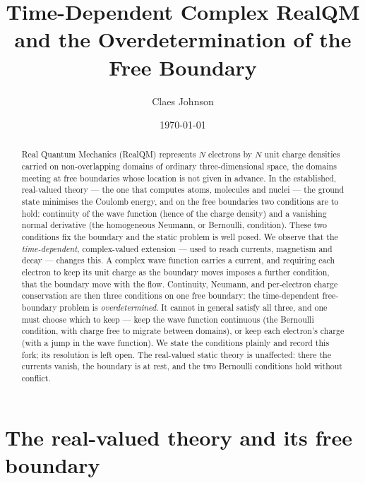 \documentclass[11pt]{article}
\title{Time-Dependent Complex RealQM\\
and the Overdetermination of the Free Boundary}
\author[1]{Claes Johnson}
\affil[1]{KTH Royal Institute of Technology, SE-100 44 Stockholm, Sweden \\
\texttt{claesjohnson@gmail.com}}
\date{\today}
\begin{document}
\maketitle

\begin{abstract}
Real Quantum Mechanics (RealQM) represents $N$ electrons by $N$ unit charge densities carried on
non-overlapping domains of ordinary three-dimensional space, the domains meeting at free boundaries whose
location is not given in advance. In the established, real-valued theory --- the one that computes atoms,
molecules and nuclei --- the ground state minimises the Coulomb energy, and on the free boundaries two
conditions are to hold: continuity of the wave function (hence of the charge density) and a vanishing normal
derivative (the homogeneous Neumann, or Bernoulli, condition). These two conditions fix the boundary and the
static problem is well posed. We observe that the \emph{time-dependent}, complex-valued extension --- used to
reach currents, magnetism and decay --- changes this. A complex wave function carries a current, and
requiring each electron to keep its unit charge as the boundary moves imposes a further condition, that the
boundary move with the flow. Continuity, Neumann, and per-electron charge conservation are then three
conditions on one free boundary: the time-dependent free-boundary problem is \emph{overdetermined}. It
cannot in general satisfy all three, and one must choose which to keep --- keep the wave function continuous
(the Bernoulli condition, with charge free to migrate between domains), or keep each electron's charge (with
a jump in the wave function). We state the conditions plainly and record this fork; its resolution is left
open. The real-valued static theory is unaffected: there the currents vanish, the boundary is at rest, and
the two Bernoulli conditions hold without conflict.
\end{abstract}


\section{The real-valued theory and its free boundary}
\label{sec:static}
\end{document}
